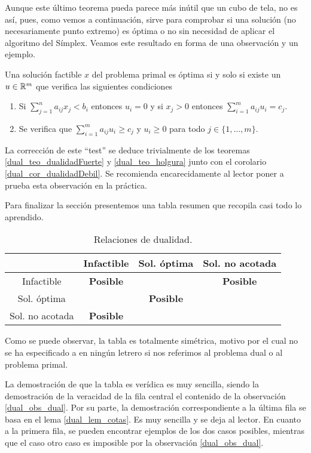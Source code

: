 Aunque este último teorema pueda parece más inútil que un cubo de tela, no es así, pues, como vemos a continuación, sirve para comprobar si una solución (no necesariamente punto extremo) es óptima o no sin necesidad de aplicar el algoritmo del Símplex. Veamos este resultado en forma de una observación y un ejemplo.
\begin{obs}
	Una solución factible $x$ del problema primal es óptima si y solo si existe un $u\in\mathbb{R}^m$ que verifica las siguientes condiciones
	\begin{enumerate}
		\item Si $\sum_{j=1}^{n}a_{ij}x_j<b_i$ entonces $u_i=0$ y si $x_j>0$ entonces $\sum_{i=1}^{m}a_{ij}u_i=c_j$.
		\item Se verifica que $\sum_{i=1}^{m}a_{ij}u_i\geq c_j$ y $u_i\geq 0$ para todo $j\in\{1,\dots,m\}$.
	\end{enumerate}
	La corrección de este ``test'' se deduce trivialmente de los teoremas \ref{dual_teo_dualidadFuerte} y \ref{dual_teo_holgura} junto con el corolario \ref{dual_cor_dualidadDebil}. Se recomienda encarecidamente al lector poner a prueba esta observación en la práctica.
\end{obs}
Para finalizar la sección presentemos una tabla resumen que recopila casi todo lo aprendido.
\begin{table}[H]
	\centering
	\begin{tabular}{c|c|c|c|}
		\multicolumn{1}{l|}{} & Infactible & Sol. óptima & Sol. no acotada \\ \hline
		Infactible & \textbf{Posible} & \cellcolor[HTML]{C0C0C0}{\color[HTML]{FFCCC9} \textbf{}} & \textbf{Posible} \\ \hline
		Sol. óptima & \cellcolor[HTML]{C0C0C0}\textbf{} & \textbf{Posible} & \cellcolor[HTML]{C0C0C0}\textbf{} \\ \hline
		Sol. no acotada & \textbf{Posible} & \cellcolor[HTML]{C0C0C0}\textbf{} & \cellcolor[HTML]{C0C0C0}\textbf{} \\ \hline
	\end{tabular}
	\caption{Relaciones de dualidad.}
	\label{dual_tab_tabla}
\end{table}
Como se puede observar, la tabla es totalmente simétrica, motivo por el cual no se ha especificado a en ningún letrero si nos referimos al problema dual o al problema primal.

La demostración de que la tabla es verídica es muy sencilla, siendo la demostración de la veracidad de la fila central el contenido de la observación \ref{dual_obs_dual}. Por su parte, la demostración correspondiente a la última fila se basa en el lema \ref{dual_lem_cotas}. Es muy sencilla y se deja al lector. En cuanto a la primera fila, se pueden encontrar ejemplos de los dos casos posibles, mientras que el caso otro caso es imposible por la observación \ref{dual_obs_dual}.
